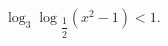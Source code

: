 \begin{ex}[type=inequality]
	\begin{condition}
		$ \log_3\log$\tiny$_{\dfrac{1}{2}}$\normalsize$(x^2 - 1)<1 .$
	\end{condition}
\end{ex}
